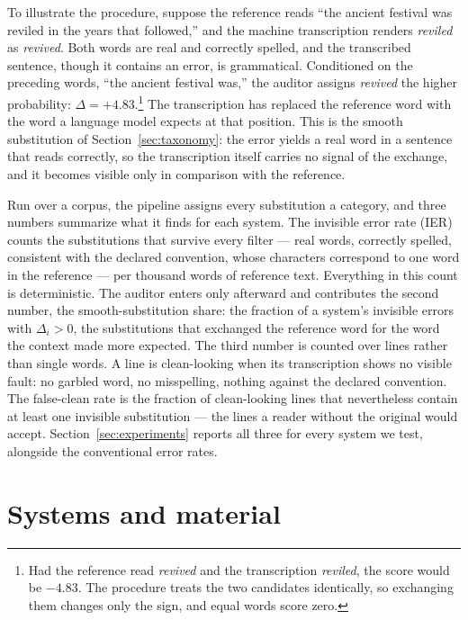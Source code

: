 \documentclass{anthology-ch}         %
\begin{document}
To illustrate the procedure, suppose the reference reads ``the ancient
festival was reviled in the years that followed,'' and the machine transcription renders \emph{reviled} as \emph{revived}. Both words are real and correctly spelled, and the transcribed sentence, though it contains an error, is grammatical. Conditioned on the preceding words, ``the ancient festival was,'' the auditor assigns \emph{revived} the higher probability: $\Delta = +4.83$.\footnote{Had the reference read \emph{revived} and the transcription \emph{reviled}, the score would be $-4.83$. The procedure treats the two candidates identically, so exchanging them changes only the sign, and equal words score zero.} The transcription has replaced the reference word with the word a language model expects at that position. This is the smooth substitution of Section~\ref{sec:taxonomy}: the error yields a real word in a sentence that reads correctly, so the transcription itself carries no signal of the exchange, and it becomes visible only in comparison with the reference.

Run over a corpus, the pipeline assigns every substitution a category, and three numbers summarize what it finds for each system. The invisible error rate (IER) counts the substitutions that survive every filter --- real words, correctly spelled, consistent with the declared convention, whose characters correspond to one word in the reference --- per thousand words of reference text. Everything in this count is deterministic. The auditor enters only afterward and contributes the second number, the smooth-substitution share: the fraction of a system's invisible errors with $\Delta_i > 0$, the substitutions that exchanged the reference word for the word the context made more expected. The third number is counted over lines rather than single words. A line is clean-looking when its transcription shows no visible fault: no garbled word, no misspelling, nothing against the declared convention. The false-clean rate is the fraction of clean-looking lines that nevertheless contain at least one invisible substitution --- the lines a reader without the original would accept. Section~\ref{sec:experiments} reports all three for every system we test, alongside the conventional error rates.

\section{Systems and material}
\label{sec:design}
\end{document}
